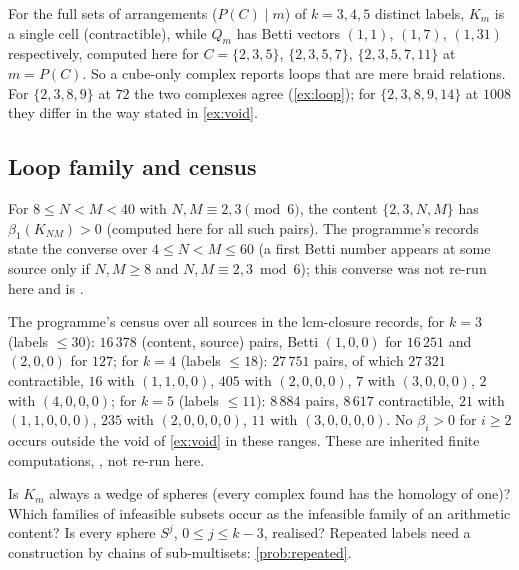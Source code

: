 \begin{proposition}\label{prop:cubperm}
For the full sets of arrangements ($P(C)\mid m$) of $k=3,4,5$ distinct labels, $K_m$ is a single cell (contractible), while $Q_m$ has Betti vectors $(1,1)$, $(1,7)$, $(1,31)$ respectively, computed here for $C=\{2,3,5\}$, $\{2,3,5,7\}$, $\{2,3,5,7,11\}$ at $m=P(C)$. So a cube-only complex reports loops that are mere braid relations. For $\{2,3,8,9\}$ at $72$ the two complexes agree (\cref{ex:loop}); for $\{2,3,8,9,14\}$ at $1008$ they differ in the way stated in \cref{ex:void}.
\end{proposition}

\subsection{Loop family and census}
\begin{proposition}\label{prop:loopfam}
For $8\le N<M<40$ with $N,M\equiv2,3\pmod 6$, the content $\{2,3,N,M\}$ has $\beta_1(K_{NM})>0$ (computed here for all such pairs). The programme's records state the converse over $4\le N<M\le60$ (a first Betti number appears at some source only if $N,M\ge8$ and $N,M\equiv2,3\bmod6$); this converse was not re-run here and is .
\end{proposition}
\begin{proposition}\label{prop:census}
The programme's census over all sources in the lcm-closure records, for $k=3$ (labels $\le30$): $16\,378$ (content, source) pairs, Betti $(1,0,0)$ for $16\,251$ and $(2,0,0)$ for $127$; for $k=4$ (labels $\le18$): $27\,751$ pairs, of which $27\,321$ contractible, $16$ with $(1,1,0,0)$, $405$ with $(2,0,0,0)$, $7$ with $(3,0,0,0)$, $2$ with $(4,0,0,0)$; for $k=5$ (labels $\le11$): $8\,884$ pairs, $8\,617$ contractible, $21$ with $(1,1,0,0,0)$, $235$ with $(2,0,0,0,0)$, $11$ with $(3,0,0,0,0)$. No $\beta_i>0$ for $i\ge2$ occurs outside the void of \cref{ex:void} in these ranges. These are inherited finite computations, , not re-run here.
\end{proposition}
\begin{problem}\label{prob:wedge}
Is $K_m$ always a wedge of spheres (every complex found has the homology of one)? Which families of infeasible subsets occur as the infeasible family of an arithmetic content? Is every sphere $S^j$, $0\le j\le k-3$, realised? Repeated labels need a construction by chains of sub-multisets: \cref{prob:repeated}.
\end{problem}
